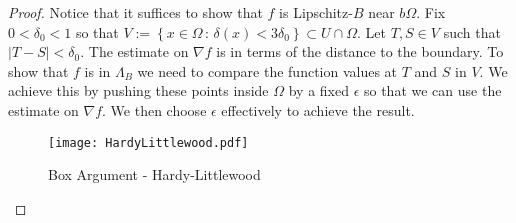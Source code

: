 \documentclass[12pt,a4paper]{amsart}
\numberwithin{equation}{section}
\theoremstyle{definition}
\begin{document}
\begin{proof}Notice that it suffices to show that $f$ is Lipschitz-$B$ near $b\Omega$. Fix $0 < \delta_0 < 1$ so that $V := \left\{ x\in\Omega \, :\, \delta(x) < 3\delta_0\right\}\subset U\cap\Omega$. Let $T,S\in V$ 
such that ${\left\lvert{T-S}\right\rvert}<\delta_0$. The estimate on $\nabla f$ is in terms of the distance to the boundary. To show that $f$ is in $\Lambda_{B}$ we need to compare the function values at $T$ and $S$ in $V$. We 
achieve this by pushing these points inside $\Omega$ by a fixed $\epsilon$ so that we can use the estimate on $\nabla f$. We then choose $\epsilon$ effectively to achieve the result.
\begin{figure}[htp]
\centering
\texttt{[image: HardyLittlewood.pdf]}
\caption{Box Argument - Hardy-Littlewood}
\end{figure}


\end{proof}
\end{document}

